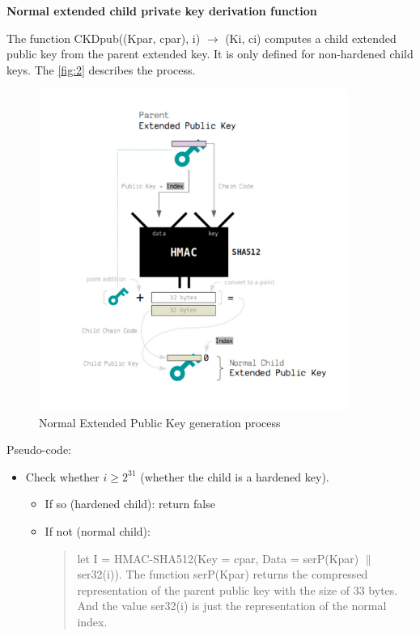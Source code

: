 \begin{adjustwidth}{0.5cm}{}
    \bigskip
    {\textbf{Normal extended child private key derivation function}}
    \label{norm2}

    The function CKDpub((Kpar, cpar), i) $\rightarrow$ (Ki, ci) computes a child extended public key from the parent extended key. It is only defined for non-hardened child keys.
    The \autoref{fig:2} describes the process.

    \begin{figure}[ht!]
        \centering
        \includegraphics[width=0.9\textwidth]{images/normal_pub_gen.png}
        \caption[Normal Extended Public Key generation process]{Normal Extended Public Key generation process}
        \label{fig:2}
    \end{figure}

    Pseudo-code:
    \begin{itemize}
        \item Check whether $i \geq 2^{31}$ (whether the child is a hardened key).
              \begin{itemize}
                  \item If so (hardened child): return false

                  \item If not (normal child):
                        \begin{quote}

                            let I = HMAC-SHA512(Key = cpar, Data = serP(Kpar) $\parallel$ ser32(i)).
                            The function serP(Kpar) returns the compressed representation of the parent public key with the size of 33 bytes. And the value ser32(i) is just the representation of the normal index.
                        \end{quote}
              \end{itemize}
              \bigskip


\end{itemize}
\end{adjustwidth}
